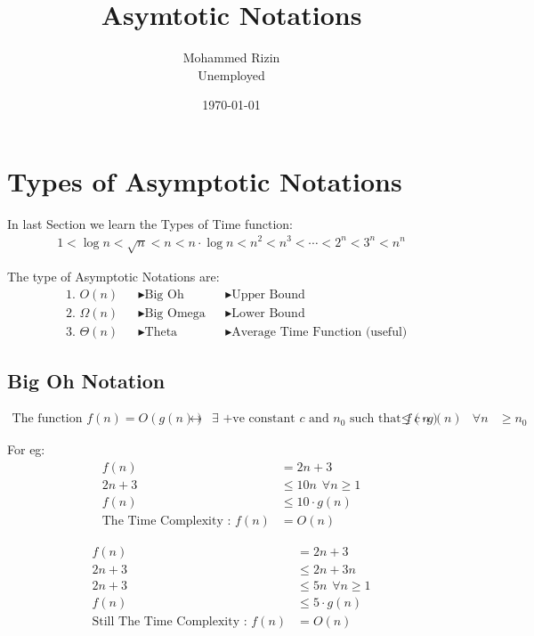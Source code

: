 \documentclass{article}
\title{Asymtotic Notations}
\author{Mohammed Rizin \\ Unemployed}
\date{\today}
\begin{document}
\maketitle

\section{Types of Asymptotic Notations}

In last Section we learn the Types of Time function:
\[
\boxed{
\begin{aligned}
    1 < \log{n} < \sqrt{n} < n < n\cdot \log{n} < n^2 < n^3 < \cdots < 2^n <  3^n < n^n
\end{aligned}
}
\]

The type of Asymptotic Notations are:
\[
\begin{aligned}
    &\text{1. } O(n) &&\blacktriangleright \text{Big Oh} &&\blacktriangleright \text{Upper Bound} \\
    &\text{2. } \Omega(n) &&\blacktriangleright \text{Big Omega} &&\blacktriangleright \text{Lower Bound} \\
    &\text{3. } \Theta(n) &&\blacktriangleright \text{Theta} &&\blacktriangleright \text{Average Time Function (useful)}
\end{aligned}
\]

\subsection{Big Oh Notation}
\[
\begin{aligned}
        \text{The function } f(n) = O{(g(n))} &\leftrightarrow &\exists \text{ +ve constant $c$ and } 
        n_0 \text{ such that } f{(n)} &\leq c \cdot g{(n)} &\forall n &\geq n_0  
\end{aligned}
\]

For eg:
\[
\begin{aligned}
        f(n) &= 2n + 3 \\
        2n+3 &\leq 10n \hspace{5pt} \forall n \geq 1 \\
        f(n) &\leq 10 \cdot g(n) \\
        \text{The Time Complexity : } f(n) &= O(n)
\end{aligned}
\]

\[
\begin{aligned}
        f(n) &= 2n + 3 \\
        2n+3 &\leq 2n + 3n \\
        2n+3 &\leq 5n \hspace{5pt} \forall n \geq 1 \\
        f(n) &\leq 5 \cdot g(n) \\
        \text{Still The Time Complexity : } f(n) &= O(n)
\end{aligned}
\]
\end{document}
